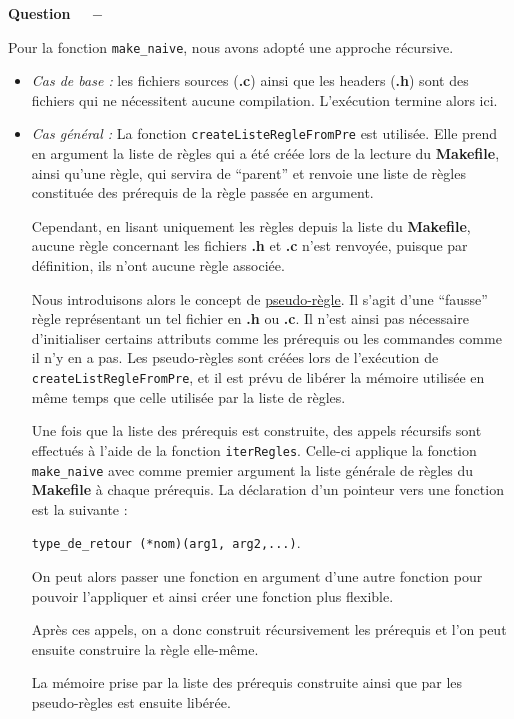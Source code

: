 \documentclass[11pt]{article}
\newcounter{question}[section]
\newenvironment{question}[1][]{\refstepcounter{question}\par\medskip
   \noindent\textbf{Question~\thequestion ~ $-$} \rmfamily}{}
\begin{document}
\begin{question} %

Pour la fonction \texttt{make\_naive}, nous avons adopté une approche récursive.
\begin{itemize}
	\item \emph{Cas de base :} les fichiers sources (\textbf{.c}) ainsi que les headers (\textbf{.h}) sont des fichiers qui ne nécessitent aucune compilation.
	L'exécution termine alors ici.
	\item \emph{Cas général :} La fonction \texttt{createListeRegleFromPre} est utilisée. Elle prend en argument la liste de règles qui a été créée lors de la lecture du \textbf{Makefile}, ainsi qu'une règle, qui servira de ``parent''
	et renvoie une liste de règles constituée des prérequis de la règle passée en argument.

	Cependant, en lisant uniquement les règles depuis la liste du \textbf{Makefile}, aucune règle concernant les fichiers \textbf{.h} et \textbf{.c} n'est renvoyée, puisque par définition, ils n'ont aucune règle associée.

	Nous introduisons alors le concept de \underline{pseudo-règle}. Il s'agit d'une ``fausse'' règle représentant un tel fichier en \textbf{.h} ou \textbf{.c}. Il n'est ainsi pas nécessaire d'initialiser certains attributs comme les prérequis ou les commandes comme il n'y en a pas.
	Les pseudo-règles sont créées lors de l'exécution de \texttt{createListRegleFromPre}, et il est prévu de libérer la mémoire utilisée en même temps que celle utilisée par la liste de règles.

	Une fois que la liste des prérequis est construite, des appels récursifs sont effectués à l'aide de la fonction \texttt{iterRegles}. Celle-ci applique la fonction \texttt{make\_naive} avec comme premier argument la liste générale de règles du \textbf{Makefile} à chaque prérequis.
	La déclaration d'un pointeur vers une fonction est la suivante \cite{functionPointers} : 
	\begin{center}
		\texttt{type\_de\_retour  (*nom)(arg1, arg2,...)}. 
	\end{center}
	On peut alors passer une fonction en argument d'une autre fonction pour pouvoir l'appliquer et ainsi créer une fonction plus flexible. 

	Après ces appels, on a donc construit récursivement les prérequis et l'on peut ensuite construire la règle elle-même.
	
	La mémoire prise par la liste des prérequis construite ainsi que par les pseudo-règles est ensuite libérée.
\end{itemize}
\end{question}
\end{document}
